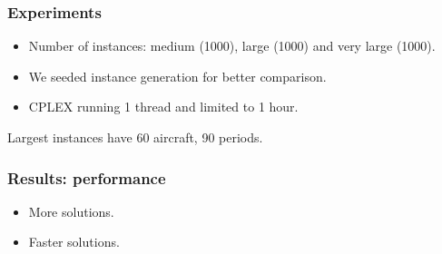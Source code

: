 \begin{frame}
\frametitle{\textbf{Experiments}}
  
  \begin{itemize}
  \item Number of instances: medium (1000), large (1000) and very large
    (1000).
  \item We seeded instance generation for better comparison.
  \item CPLEX running 1 thread and limited to 1 hour.
  \end{itemize}

  Largest instances have 60 aircraft, 90 periods.
\end{frame}

\begin{frame}[t]
\frametitle{\textbf{Results: performance}}

  \begin{itemize}[<+->]
    \item More solutions.
    \item Faster solutions.
  \end{itemize}

\end{frame}

